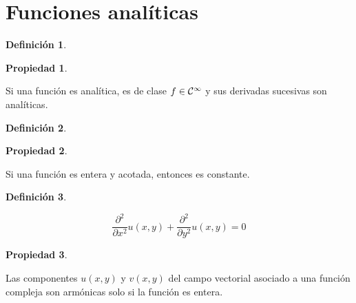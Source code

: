 \documentclass[a5paper,12pt,twoside]{book}
\newtheorem{defn}{{Definición}}[chapter]
\newtheorem{prop}{{Propiedad}}[chapter]
\begin{document}
\section{Funciones analíticas}

\begin{mdframed}[style=DefinitionFrame]
    \begin{defn}
    \end{defn}
\end{mdframed}

\begin{mdframed}[style=PropertyFrame]
    \begin{prop}
    \end{prop}
    Si una función es analítica, es de clase $f \in \class[\infty]$ y sus derivadas sucesivas son analíticas.
\end{mdframed}

\begin{mdframed}[style=PropertyFrame]
    \begin{defn}
    \end{defn}
\end{mdframed}

\begin{mdframed}[style=PropertyFrame]
    \begin{prop}
    \end{prop}
    Si una función es entera y acotada, entonces es constante.
\end{mdframed}

\begin{mdframed}[style=PropertyFrame]
    \begin{defn}
    \end{defn}
    \begin{equation*}
        \frac{\partial^2}{\partial x^2} u(x,y) + \frac{\partial^2}{\partial y^2} u(x,y) = 0
    \end{equation*}
\end{mdframed}

\begin{mdframed}[style=PropertyFrame]
    \begin{prop}
    \end{prop}
    Las componentes $u(x,y)$ y $v(x,y)$ del campo vectorial asociado a una función compleja son armónicas solo si la función es entera.
\end{mdframed}
\end{document}
